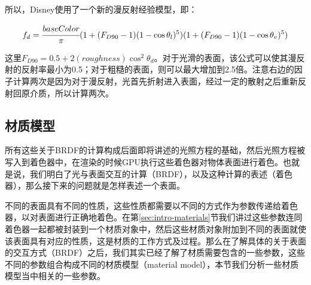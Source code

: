 


所以，Disney使用了一个新的漫反射经验模型，即：

\begin{equation}\label{eq:intro-disney-diff}
	f_d= \cfrac{baseColor}{\pi}(1+(F_{D90}-1)(1-\cos\theta_l)^5)(1+(F_{D90}-1)(1-\cos\theta_v)^5)
\end{equation} 

\noindent 这里$F_{D90}=0.5+2(roughness) \cos^2\theta_d$。对于光滑的表面，该公式可以使其漫反射的反射率最小为0.5；对于粗糙的表面，则可以最大增加到2.5倍。注意右边的因子计算两次是因为对于漫反射，光首先折射进入表面，经过一定的散射之后重新反射回原介质，所以计算两次。





\subsection{材质模型}\label{sec:intro-material-model}
所有这些关于BRDF的计算构成后面即将讲述的光照方程的基础，然后光照方程被写入到着色器中，在渲染的时候GPU执行这些着色器对物体表面进行着色。也就是说，我们明白了光与表面交互的计算（BRDF），以及这种计算的表述（着色器），那么接下来的问题就是怎样表述一个表面。

不同的表面具有不同的性质，这些性质都需要以不同的方式作为参数传递给着色器，以对表面进行正确地着色。在第\ref{sec:intro-materials}节我们讲过这些参数连同着色器一起都被封装到一个材质对象中，然后这些材质对象附加到不同的表面就使该表面具有对应的性质，这是材质的工作方式及过程。那么在了解具体的关于表面的交互方式（BRDF）之后，我们其实已经了解了材质需要包含的一些参数，这些不同的参数组合构成不同的材质模型（material model），本节我们分析一些材质模型当中相关的一些参数。

